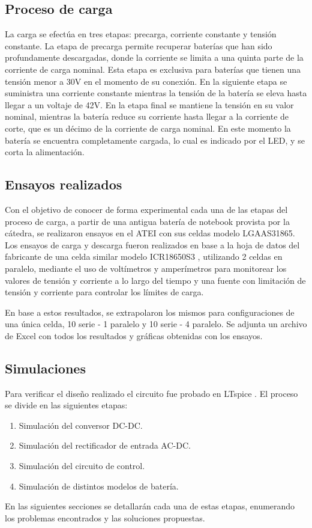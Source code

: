 \subsection{Proceso de carga}
La carga se efectúa en tres etapas: precarga, corriente constante y tensión constante. 
La etapa de precarga permite recuperar baterías que han sido profundamente descargadas, donde la
corriente se limita a una quinta parte de la corriente de carga nominal. 
Esta etapa es exclusiva para baterías que tienen una tensión menor a 30V en el momento de su conexión. 
En la siguiente etapa se suministra una corriente constante mientras la tensión de la batería se eleva hasta
llegar a un voltaje de 42V. En la etapa final se mantiene la tensión en su valor nominal, mientras
la batería reduce su corriente hasta llegar a la corriente de corte, que es un décimo de la corriente de carga nominal.
En este momento la batería se
encuentra completamente cargada, lo cual es indicado por el LED, y se corta la alimentación.

\subsection{Ensayos realizados}
Con el objetivo de conocer de forma experimental cada una de las etapas del proceso de carga,
a partir de una antigua batería de notebook provista por la cátedra,
se realizaron ensayos en el ATEI con sus celdas modelo LGAAS31865.
Los ensayos de carga y descarga fueron realizados en base a la hoja de datos
del fabricante de una celda similar modelo ICR18650S3 \cite{icr18650s3}, utilizando 2 celdas en paralelo,
mediante el uso de voltímetros y amperímetros para monitorear los valores de tensión y corriente a lo largo del tiempo
y una fuente con limitación de tensión y corriente para controlar los límites de carga.

En base a estos resultados, se extrapolaron los mismos para configuraciones de una única celda,
10 serie - 1 paralelo y 10 serie - 4 paralelo. 
Se adjunta un archivo de Excel con todos los resultados y gráficas obtenidas con los ensayos.

\subsection{Simulaciones}
Para verificar el diseño realizado el circuito fue probado en LTspice \cite{ltspice}.
El proceso se divide en las siguientes etapas:
\begin{enumerate}
    \item Simulación del conversor DC-DC.
    \item Simulación del rectificador de entrada AC-DC.
    \item Simulación del circuito de control.
    \item Simulación de distintos modelos de batería.
\end{enumerate}
En las siguientes secciones se detallarán cada una de estas etapas,
enumerando los problemas encontrados y las soluciones propuestas.

